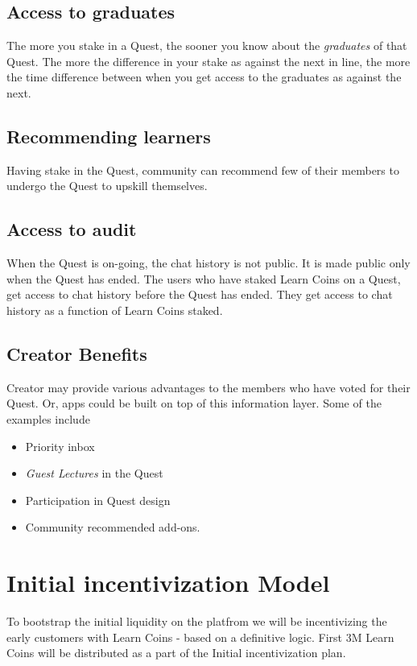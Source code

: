 \documentclass{article}
\begin{document}
    \subsection{Access to graduates}
      The more you stake in a Quest, the sooner you know about the \textit{graduates} of that Quest.
      The more the difference in your stake as against the next in line, the more the time difference between when you get access to the graduates as against the next. %
    \subsection{Recommending learners}
      Having stake in the Quest, community can recommend few of their members to undergo the Quest to upskill themselves.
    \subsection{Access to audit}
      When the Quest is on-going, the chat history is not public. It is made public only when the Quest has ended.
      The users who have staked Learn Coins on a Quest, get access to chat history before the Quest has ended. 
      They get access to chat history as a function of Learn Coins staked.
    \subsection{Creator Benefits}
      Creator may provide various advantages to the members who have voted for their Quest. Or, apps could be built on top of this information layer. Some of the examples include 
      \begin{itemize}
        \item Priority inbox
        \item \textit{Guest Lectures} in the Quest
        \item Participation in Quest design 
        \item Community recommended add-ons.
      \end{itemize}

  \section{Initial incentivization Model}
    To bootstrap the initial liquidity on the platfrom we will be incentivizing the early customers with Learn Coins - based on a definitive logic.
    First 3M Learn Coins will be distributed as a part of the Initial incentivization plan.
\end{document}
